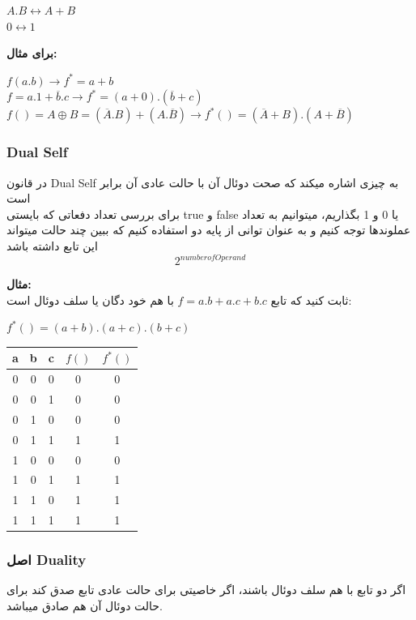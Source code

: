 \documentclass[20pt, a5paper]{article}
\begin{document}
\raggedright
$A.B \leftrightarrow A+B$\\
$0 \leftrightarrow 1$

\raggedleft
\justifying
\textbf{برای مثال:}\\

\raggedright
$f(a.b) \rightarrow f^{*} = a+b$\\
$f = a.1 + \overline{b}.c \rightarrow f^{*}=(a+0) . (\overline{b}+c) $\\
$f()= A \oplus B = (\overline{A}.B) + (A.\overline{B}) \rightarrow f^{*}()= (\overline{A}+B) . (A+\overline{B})$


\raggedleft
\justifying
\subsubsection{Dual Self}
در قانون Dual Self به چیزی اشاره میکند که صحت دوئال آن با حالت عادی آن برابر است\\
برای بررسی تعداد دفعاتی که بایستی true و false یا 0 و 1 بگذاریم، میتوانیم به تعداد عملوندها توجه کنیم و به عنوان توانی از پایه دو استفاده کنیم که ببین چند حالت میتواند این تابع داشته باشد\\
\begin{equation}
	2^{number of Operand}
\end{equation}


\textbf{مثال:}\\
ثابت کنید که تابع
$f=a.b + a.c + b.c$
با هم خود دگان یا سلف دوئال است:\\

\raggedright
$f^{*}() = (a+b).(a+c).(b+c)$

\center
\begin{LTR}
\begin{tabular}{ c c c | c | c}
	a & b & c & $f()$ & $f^{*}()$\\
	\hline
	0 & 0 & 0 & 0 & 0 \\ 				
	0 & 0 & 1 & 0 & 0\\
	0 & 1 & 0 & 0 & 0\\
	0 & 1 & 1 & 1 & 1\\
	1 & 0 & 0 & 0 & 0\\
	1 & 0 & 1 & 1 & 1\\
	1 & 1 & 0 & 1 & 1\\
	1 & 1 & 1 & 1 & 1\\
\end{tabular}
\end{LTR}
\raggedleft
\justifying

\subsubsection{اصل Duality}
اگر دو تابع با هم سلف دوئال باشند، اگر خاصیتی برای حالت عادی تابع صدق کند برای حالت دوئال آن هم صادق میباشد.\\
\end{document}
